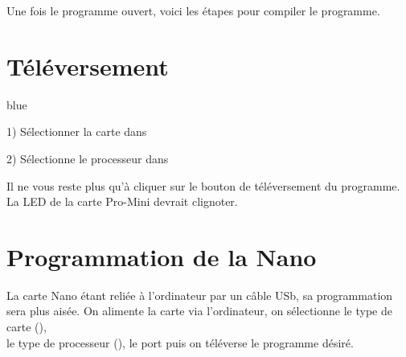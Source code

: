 Une fois le programme ouvert, voici les étapes pour compiler le programme.

  \section{Téléversement}

  \begin{items}{blue}{\Triangle}
    \item 1) Sélectionner la carte  dans 

    \item 2) Sélectionne le processeur  dans 
  \end{items}

 
  Il ne vous reste plus qu'à cliquer sur le bouton de téléversement du programme.\\
  La LED de la carte Pro-Mini devrait clignoter.



 

  \section{Programmation de la Nano}

  La carte Nano étant reliée à l'ordinateur par un câble USb, sa programmation sera plus aisée. 
  On alimente la carte via l'ordinateur, on sélectionne le type de carte (),\\
   le type de processeur (), le port puis on téléverse le programme désiré.\\



